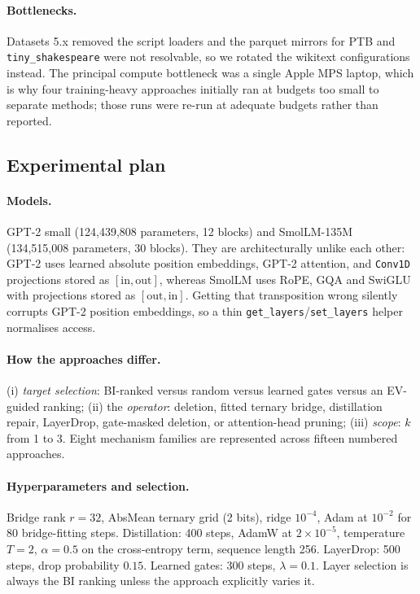 \documentclass[11pt]{article}
\begin{document}
\paragraph{Bottlenecks.} Datasets 5.x removed the script loaders and the
parquet mirrors for PTB and \texttt{tiny\_shakespeare} were not resolvable, so
we rotated the wikitext configurations instead. The principal compute
bottleneck was a single Apple MPS laptop, which is why four training-heavy
approaches initially ran at budgets too small to separate methods; those runs
were re-run at adequate budgets rather than reported.

\subsection{Experimental plan}
\paragraph{Models.} GPT-2 small (124,439,808 parameters, 12 blocks) and
SmolLM-135M (134,515,008 parameters, 30 blocks). They are architecturally
unlike each other: GPT-2 uses learned absolute position embeddings, GPT-2
attention, and \texttt{Conv1D} projections stored as $[\text{in},\text{out}]$,
whereas SmolLM uses RoPE, GQA and SwiGLU with projections stored as
$[\text{out},\text{in}]$. Getting that transposition wrong silently corrupts
GPT-2 position embeddings, so a thin \texttt{get\_layers}/\texttt{set\_layers}
helper normalises access.
\paragraph{How the approaches differ.} (i) \emph{target selection}: BI-ranked
versus random versus learned gates versus an EV-guided ranking; (ii) the
\emph{operator}: deletion, fitted ternary bridge, distillation repair,
LayerDrop, gate-masked deletion, or attention-head pruning; (iii)
\emph{scope}: $k$ from 1 to 3. Eight mechanism families are represented across
fifteen numbered approaches.
\paragraph{Hyperparameters and selection.} Bridge rank $r=32$, AbsMean ternary
grid (2 bits), ridge $10^{-4}$, Adam at $10^{-2}$ for 80 bridge-fitting steps.
Distillation: 400 steps, AdamW at $2\times10^{-5}$, temperature $T=2$,
$\alpha=0.5$ on the cross-entropy term, sequence length 256. LayerDrop:
500 steps, drop probability $0.15$. Learned gates: 300 steps, $\lambda=0.1$.
Layer selection is always the BI ranking unless the approach explicitly
varies it.
\end{document}
